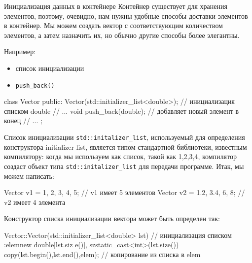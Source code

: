 \documentclass[
    8pt,
    hyperref={pdfencoding=unicode}
    ]{beamer}
\theoremstyle{definition}
\begin{document}
\begin{frame}[fragile]{Инициализация данных в контейнере}
    Контейнер существует для хранения элементов, поэтому, очевидно, нам нужны удобные способы доставки элементов в контейнер.
    Мы можем создать вектор с соответствующим количеством элементов, а затем назначить их, но обычно другие способы более элегантны.
    
    Например:
    \begin{itemize}
        \item список инициализации
        \item \texttt{push_back()}
    \end{itemize}

    \begin{cppcode}
        class Vector {
            public:
            Vector(std::initializer_list<double>); // инициализация списком double
            // ...
            void push_back(double); // добавляет новый элемент в конец
            // ...
        };
    \end{cppcode}
\end{frame}


\begin{frame}[fragile]{Список инициализации}
   \texttt{std::initalizer_list}, используемый для определения конструктора initializer-list, является типом стандартной библиотеки, известным компилятору: когда мы используем {} как список, такой как {1,2,3,4}, компилятор создаст объект типа \texttt{std::initalizer_list} для передачи программе. Итак, мы можем написать:
   \begin{cppcode}
       Vector v1 = {1, 2, 3, 4, 5}; // v1 имеет 5 элементов
       Vector v2 = {1.2, 3.4, 6, 8}; // v2 имеет 4 элемента
   \end{cppcode}
    
    \vfill
    Конструктор списка инициализации вектора может быть определен так:
    
    \begin{cppcode}
        Vector::Vector(std::initializer_list<double> lst) // инициализация списком
        :elem{new double[lst.siz e()]}, sz{static_cast<int>(lst.size())}
        {
            copy(lst.begin(),lst.end(),elem); // копирование из списка в elem
        }
    \end{cppcode}
    
\end{frame}
\end{document}
